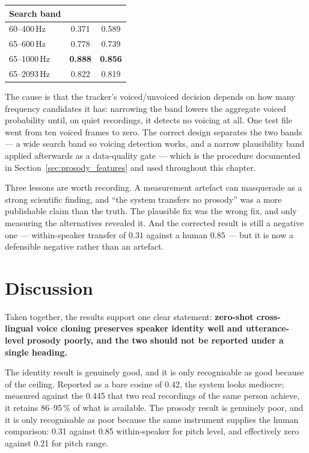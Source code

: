 \begin{center}
{\singlespacing\small
\begin{tabular}{@{}lcc@{}}
\toprule
\textbf{Search band} & \textbf{\ento{}} & \textbf{\esto{}} \\
\midrule
60--400\,Hz   & 0.371 & 0.589 \\
65--600\,Hz   & 0.778 & 0.739 \\
65--1000\,Hz  & \textbf{0.888} & \textbf{0.856} \\
65--2093\,Hz  & 0.822 & 0.819 \\
\bottomrule
\end{tabular}\par}
\end{center}

The cause is that the tracker's voiced/unvoiced decision depends on how many frequency candidates
it has: narrowing the band lowers the aggregate voiced probability until, on quiet recordings, it
detects no voicing at all. One test file went from ten voiced frames to zero. The correct design
separates the two bands --- a wide search band so voicing detection works, and a narrow
plausibility band applied afterwards as a data-quality gate --- which is the procedure documented in
Section~\ref{sec:prosody_features} and used throughout this chapter.

Three lessons are worth recording. A measurement artefact can masquerade as a strong scientific
finding, and ``the system transfers no prosody'' was a more publishable claim than the truth. The
plausible fix was the wrong fix, and only measuring the alternatives revealed it. And the corrected
result is still a negative one --- within-speaker transfer of $0.31$ against a human $0.85$ --- but
it is now a defensible negative rather than an artefact.

\section{Discussion}
\label{sec:discussion}

Taken together, the results support one clear statement: \textbf{zero-shot cross-lingual voice
cloning preserves speaker identity well and utterance-level prosody poorly, and the two should not
be reported under a single heading.}

The identity result is genuinely good, and it is only recognisable as good because of the ceiling.
Reported as a bare cosine of 0.42, the system looks mediocre; measured against the 0.445 that two
real recordings of the same person achieve, it retains 86--95\,\% of what is available. The
prosody result is genuinely poor, and it is only recognisable as poor because the same instrument
supplies the human comparison: 0.31 against 0.85 within-speaker for pitch level, and effectively
zero against 0.21 for pitch range.

